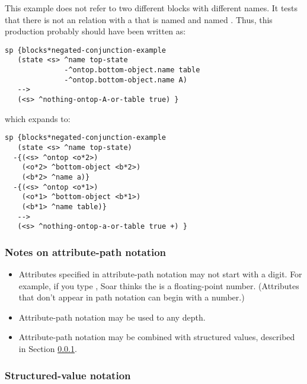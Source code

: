 This example does not refer to two different blocks with different names. It tests that there is not an  relation with a  that is named  and named . Thus, this production probably should have been written as:

\begin{verbatim}
sp {blocks*negated-conjunction-example
   (state <s> ^name top-state
              -^ontop.bottom-object.name table
              -^ontop.bottom-object.name A)
   -->
   (<s> ^nothing-ontop-A-or-table true) }
\end{verbatim}

which expands to:

\begin{verbatim}
sp {blocks*negated-conjunction-example
   (state <s> ^name top-state)
  -{(<s> ^ontop <o*2>)
    (<o*2> ^bottom-object <b*2>)
    (<b*2> ^name a)}
  -{(<s> ^ontop <o*1>)
    (<o*1> ^bottom-object <b*1>)
    (<b*1> ^name table)}
   -->
   (<s> ^nothing-ontop-a-or-table true +) }
\end{verbatim}

\subsubsection*{Notes on attribute-path notation}

\vspace{-12pt}
\begin{itemize}
	\item
		Attributes specified in attribute-path notation may not start with a digit. For example, if you type , Soar thinks the  is a floating-point number. (Attributes that don't appear in path notation can begin with a number.)
		\vspace{-6pt}
	\item
		Attribute-path notation may be used to any depth.
		\vspace{-6pt}
	\item
		Attribute-path notation may be combined with structured values, described in Section \ref{SYNTAX-pm-lhs-structured}.
		\vspace{-6pt}
\end{itemize}


\subsubsection{Structured-value notation}
\label{SYNTAX-pm-lhs-structured}

